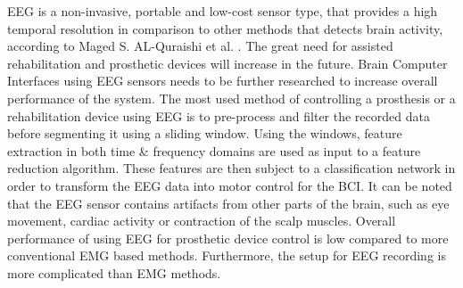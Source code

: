 \documentclass[../main.tex]{subfiles}
\begin{document}
\gls{EEG} is a non-invasive, portable and low-cost sensor type, that provides a high temporal resolution in comparison to other methods that detects brain activity, according to Maged S. AL-Quraishi et al. \cite{quraishi2018}.
The great need for assisted rehabilitation and prosthetic devices will increase in the future.
Brain Computer Interfaces using \gls{EEG} sensors needs to be further researched to increase overall performance of the system.
The most used method of controlling a prosthesis or a rehabilitation device using \gls{EEG} is to pre-process and filter the recorded data before segmenting it using a sliding window.
Using the windows, feature extraction in both time \& frequency domains are used as input to a feature reduction algorithm.
These features are then subject to a classification network in order to transform the \gls{EEG} data into motor control for the \gls{BCI}.
It can be noted that the EEG sensor contains artifacts from other parts of the brain, such as eye movement, cardiac activity or contraction of the scalp muscles. 
Overall performance of using \gls{EEG} for prosthetic device control is low compared to more conventional \gls{EMG} based methods.
Furthermore, the setup for EEG recording is more complicated than \gls{EMG} methods.



\end{document}
